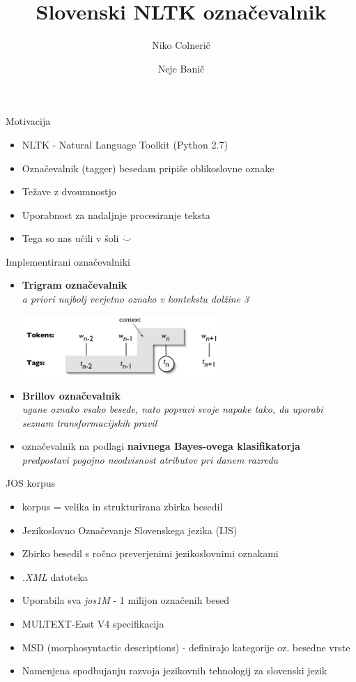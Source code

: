 \documentclass{beamer}
\title[Slovenski NLTK označevalnik]{Slovenski NLTK označevalnik}
\author{
	Niko Colnerič
	\and
	Nejc Banič}
\institute{ Fakulteta za Računalništvo in Informtiko\\
			Univerza v Ljubljani}
\begin{document}
\begin{frame}
\titlepage
\end{frame}

\begin{frame}{Motivacija}
\begin{itemize}
\item NLTK - Natural Language Toolkit (Python 2.7)
\item Označevalnik (tagger) besedam pripiše oblikoslovne oznake
\item Težave z dvoumnostjo
\item Uporabnost za nadaljnje procesiranje teksta
\item Tega so nas učili v šoli $\ddot\smile$
\end{itemize}
\end{frame}

\begin{frame}{Implementirani označevalniki}
\begin{itemize}
\item \textbf{Trigram označevalnik}\\
\textit{a priori najbolj verjetno oznako v kontekstu dolžine 3}
\begin{center}
\includegraphics[width=0.6\textwidth]{../paper/tag-context.png}
\end{center}

\item \textbf{Brillov označevalnik}\\
\textit{ugane oznako vsako besede, nato 
popravi svoje napake tako, da uporabi seznam transformacijskih pravil}
\item označevalnik na podlagi \textbf{naivnega Bayes-ovega klasifikatorja}\\
\textit{predpostavi pogojno neodvisnost atributov pri danem razredu}
\end{itemize}
\end{frame}

\begin{frame}{JOS korpus}
\begin{itemize}
\item korpus = velika in strukturirana zbirka besedil
\item Jezikoslovno Označevanje Slovenskega jezika (IJS)
\item Zbirko besedil s ročno preverjenimi jezikoslovnimi oznakami
\item \textit{.XML} datoteka
\item Uporabila sva \textit{jos1M} - 1 milijon označenih besed
\item MULTEXT-East V4 specifikacija
\item MSD (morphosyntactic descriptions) - definirajo kategorije oz. besedne vrste
\item Namenjena spodbujanju razvoja jezikovnih tehnologij za slovenski jezik
\end{itemize}
\end{frame}
\end{document}
